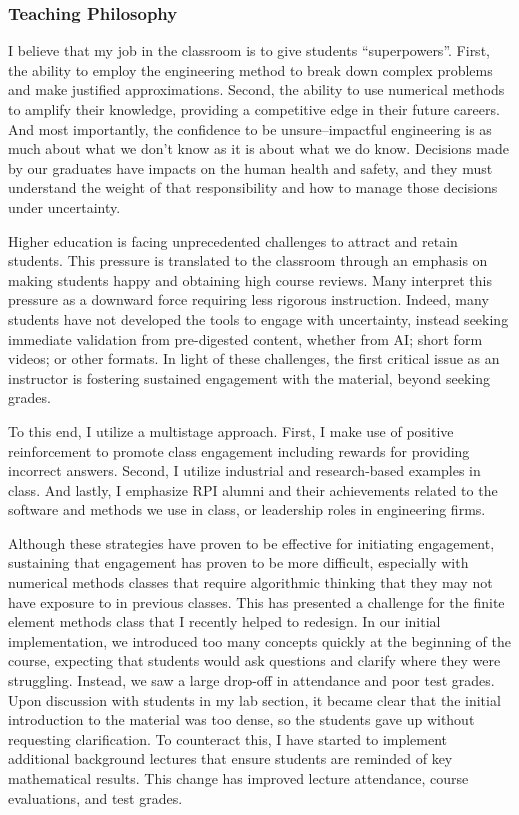 \subsubsection{Teaching Philosophy}
I believe that my job in the classroom is to give students ``superpowers''. First, the ability to employ the engineering method to break down complex problems and make justified approximations. Second, the ability to use numerical methods to amplify their knowledge, providing a competitive edge in their future careers. And most importantly, the confidence to be unsure--impactful engineering is as much about what we don't know as it is about what we do know. Decisions made by our graduates have impacts on the human health and safety, and they must understand the weight of that responsibility and how to manage those decisions under uncertainty.

Higher education is facing unprecedented challenges to attract and retain students. This pressure is translated to the classroom through an emphasis on making students happy and obtaining high course reviews. Many interpret this pressure as a downward force requiring less rigorous instruction. Indeed, many students have not developed the tools to engage with uncertainty, instead seeking immediate validation from pre-digested content, whether from AI; short form videos; or other formats. In light of these challenges, the first critical issue as an instructor is fostering sustained engagement with the material, beyond seeking grades.

To this end, I utilize a multistage approach. First, I make use of positive reinforcement to promote class engagement including rewards for providing incorrect answers. Second, I utilize industrial and research-based examples in class. And lastly, I emphasize RPI alumni and their achievements related to the software and methods we use in class, or leadership roles in engineering firms.
 
Although these strategies have proven to be effective for initiating engagement, sustaining that engagement has proven to be more difficult, especially with numerical methods classes that require algorithmic thinking that they may not have exposure to in previous classes. This has presented a challenge for the finite element methods class that I recently helped to redesign. In our initial implementation, we introduced too many concepts quickly at the beginning of the course, expecting that students would ask questions and clarify where they were struggling. Instead, we saw a large drop-off in attendance and poor test grades. Upon discussion with students in my lab section, it became clear that the initial introduction to the material was too dense, so the students gave up without requesting clarification. To counteract this, I have started to implement additional background lectures that ensure students are reminded of key mathematical results. This change has improved lecture attendance, course evaluations, and test grades.

